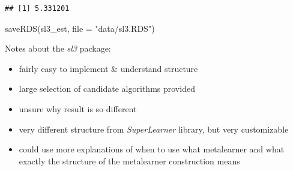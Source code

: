 \documentclass[
]{book}
\newenvironment{Shaded}{\begin{snugshade}}{\end{snugshade}}
\newcommand{\AttributeTok}[1]{\textcolor[rgb]{0.77,0.63,0.00}{#1}}
\newcommand{\CommentTok}[1]{\textcolor[rgb]{0.56,0.35,0.01}{\textit{#1}}}
\newcommand{\DecValTok}[1]{\textcolor[rgb]{0.00,0.00,0.81}{#1}}
\newcommand{\FunctionTok}[1]{\textcolor[rgb]{0.00,0.00,0.00}{#1}}
\newcommand{\NormalTok}[1]{#1}
\newcommand{\OtherTok}[1]{\textcolor[rgb]{0.56,0.35,0.01}{#1}}
\newcommand{\SpecialCharTok}[1]{\textcolor[rgb]{0.00,0.00,0.00}{#1}}
\newcommand{\StringTok}[1]{\textcolor[rgb]{0.31,0.60,0.02}{#1}}
\providecommand{\tightlist}{%
  \setlength{\itemsep}{0pt}\setlength{\parskip}{0pt}}
\begin{document}
\begin{Shaded}
\end{Shaded}

\begin{verbatim}
## [1] 5.331201
\end{verbatim}

\begin{Shaded}
\begin{Highlighting}[]
\FunctionTok{saveRDS}\NormalTok{(sl3\_est, }\AttributeTok{file =} \StringTok{"data/sl3.RDS"}\NormalTok{)}
\end{Highlighting}
\end{Shaded}

Notes about the \emph{sl3} package:

\begin{itemize}
\tightlist
\item
  fairly easy to implement \& understand structure
\item
  large selection of candidate algorithms provided
\item
  unsure why result is so different
\item
  very different structure from \emph{SuperLearner} library, but very customizable
\item
  could use more explanations of when to use what metalearner and what exactly the structure of the metalearner construction means
\end{itemize}
\end{document}
